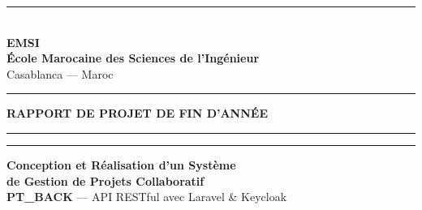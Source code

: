 \begin{titlepage}

\begin{center}

\vspace*{0.5cm}
{\color{emsiRed}\rule{\linewidth}{3pt}}\\[0.3cm]
{\fontsize{24}{28}\selectfont\bfseries\color{emsiRed} EMSI}\\[0.2cm]
{\large\bfseries\color{emsiDark} \'{E}cole Marocaine des Sciences de l'Ing\'{e}nieur}\\[0.1cm]
{\normalsize\color{emsiDark} Casablanca --- Maroc}\\[0.3cm]
{\color{emsiRed}\rule{\linewidth}{1pt}}

\vspace{1.2cm}

{\color{emsiDark}\large\bfseries RAPPORT DE PROJET DE FIN D'ANN\'{E}E}

\vspace{1cm}

{\color{emsiRed}\rule{0.3\linewidth}{2pt}}
\hspace{0.3cm}
{\color{emsiDark}}
\hspace{0.3cm}
{\color{emsiRed}\rule{0.3\linewidth}{2pt}}

\vspace{0.8cm}

\begin{mdframed}[linecolor=emsiRed, linewidth=2pt, backgroundcolor=emsiGray, topline=true, bottomline=true, leftline=false, rightline=false, innertopmargin=15pt, innerbottommargin=15pt]
  {\fontsize{18}{24}\selectfont\bfseries\color{emsiDark}
   Conception et R\'{e}alisation d'un Syst\`{e}me\\[4pt]
   de Gestion de Projets Collaboratif}\\[10pt]
  {\large\color{emsiRed}\textbf{PT\_BACK} --- API RESTful avec Laravel \& Keycloak}
\end{mdframed}

\vspace{1.2cm}

\end{center}


\end{titlepage}
